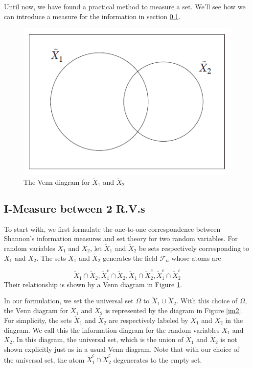 Until now, we have found a practical method to measure a set. We'll see how we can introduce a measure for the information in section \ref{sec2.1}.


\begin{figure}[ht]
 
\centering
\includegraphics[scale=0.4]{tex/Im1.png}
\caption{The Venn diagram for $\tilde{X}_{1}$ and $\tilde{X}_{2}$}
\label{im1}
 
\end{figure}

\subsection{I-Measure between 2 R.V.s}
\label{sec2.1}

To start with, we first formulate the one-to-one correspondence
between Shannon's information measures and set theory for two random variables. For random variables ${X}_1$ and ${X}_2$, let $\tilde{X}_{1}$ and $\tilde{X}_{2}$ be sets respectively corresponding to ${X}_1$ and ${X}_2$. The sets $\tilde{X}_{1}$ and $\tilde{X}_{2}$ generates the field $\mathcal{F}_{n}$ whose
atoms are 

$$\tilde{X}_{1} \cap \tilde{X}_{2}, \tilde{X}_{1}^{c} \cap \tilde{X}_{2}, \tilde{X}_{1} \cap \tilde{X}_{2}^{c}, \tilde{X}_{1}^{c} \cap \tilde{X}_{2}^{c}$$
Their relationship is shown by a Venn diagram in Figure \ref{im1}.

  In our formulation, we set the universal set $\Omega$ to $\tilde{X}_{1} \cup \tilde{X}_{2}$. With this choice of $\Omega,$ the Venn diagram for $\tilde{X}_{1}$ and $\tilde{X}_{2}$ is represented by the diagram in Figure \ref{im2}. For simplicity, the sets $\tilde{X}_{1}$ and $\tilde{X}_{2}$ are respectively labeled by $X_{1}$ and $X_{2}$ in the diagram. We call this the information diagram for the random variables $X_{1}$ and $X_{2} .$ In this diagram, the universal set, which is the union of $\tilde{X}_{1}$ and $\tilde{X}_{2}$ is not shown explicitly just as in a usual Venn diagram. Note that with our choice of the universal set, the atom $\tilde{X}_{1}^{c} \cap \tilde{X}_{2}^{c}$ degenerates to the empty set.
  
